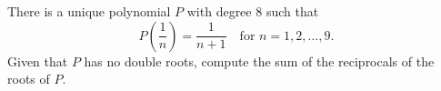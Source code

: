 There is a unique polynomial $P$ with degree $8$ such that
\[
	P\left(\frac{1}{n}\right)=\frac{1}{n+1}\quad\text{for }n=1,2,\dots,9.
\]
Given that $P$ has no double roots, compute the sum of the reciprocals of the roots of $P$.
	